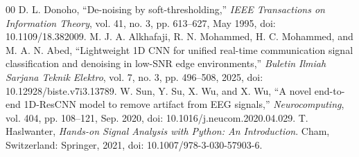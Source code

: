 \documentclass[conference]{IEEEtran}
\begin{document}
\balance
\begin{thebibliography}{00}
 D. L. Donoho, ``De-noising by soft-thresholding,'' \textit{IEEE Transactions on Information Theory}, vol. 41, no. 3, pp. 613--627, May 1995, doi: 10.1109/18.382009.
 M. J. A. Alkhafaji, R. N. Mohammed, H. C. Mohammed, and M. A. N. Abed, ``Lightweight 1D CNN for unified real-time communication signal classification and denoising in low-SNR edge environments,'' \textit{Buletin Ilmiah Sarjana Teknik Elektro}, vol. 7, no. 3, pp. 496--508, 2025, doi: 10.12928/biste.v7i3.13789.
 W. Sun, Y. Su, X. Wu, and X. Wu, ``A novel end-to-end 1D-ResCNN model to remove artifact from EEG signals,'' \textit{Neurocomputing}, vol. 404, pp. 108--121, Sep. 2020, doi: 10.1016/j.neucom.2020.04.029.
 T. Haslwanter, \textit{Hands-on Signal Analysis with Python: An Introduction}. Cham, Switzerland: Springer, 2021, doi: 10.1007/978-3-030-57903-6.
\end{thebibliography}
\end{document}
